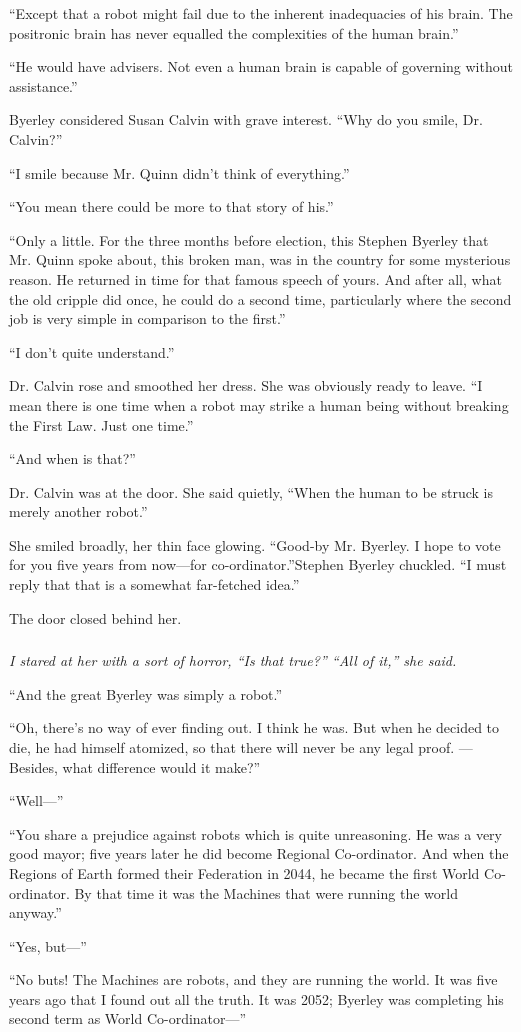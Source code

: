\documentclass[10pt,a5paper,twoside]{book}
\begin{document}
“Except that a robot might fail due to the inherent inadequacies of his brain. The positronic brain has never equalled the complexities of the human brain.”

“He would have advisers. Not even a human brain is capable of governing without assistance.”

Byerley considered Susan Calvin with grave interest. “Why do you smile, Dr. Calvin?”

“I smile because Mr. Quinn didn’t think of everything.”

“You mean there could be more to that story of his.”

“Only a little. For the three months before election, this Stephen Byerley that Mr. Quinn spoke about, this broken man, was in the country for some mysterious reason. He returned in time for that famous speech of yours. And after all, what the old cripple did once, he could do a second time, particularly where the second job is very simple in comparison to the first.”

“I don’t quite understand.”

Dr. Calvin rose and smoothed her dress. She was obviously ready to leave. “I mean there is one time when a robot may strike a human being without breaking the First Law. Just one time.”

“And when is that?”

Dr. Calvin was at the door. She said quietly, “When the human to be struck is merely another robot.”

She smiled broadly, her thin face glowing. “Good-by Mr. Byerley. I hope to vote for you five years from now—for co-ordinator.”Stephen Byerley chuckled. “I must reply that that is a somewhat far-fetched idea.”

The door closed behind her.

\subsubsection*{}
\itshape
I stared at her with a sort of horror, “Is that true?” “All of it,” she said.

“And the great Byerley was simply a robot.”

“Oh, there’s no way of ever finding out. I think he was. But when he decided to die, he had himself atomized, so that there will never be any legal proof. — Besides, what difference would it make?”

“Well—”

“You share a prejudice against robots which is quite unreasoning. He was a very good mayor; five years later he did become Regional Co-ordinator. And when the Regions of Earth formed their Federation in 2044, he became the first World Co-ordinator. By that time it was the Machines that were running the world anyway.”

“Yes, but—”

“No buts! The Machines are robots, and they are running the world. It was five years ago that I found out all the truth. It was 2052; Byerley was completing his second term as World Co-ordinator—”
\end{document}
